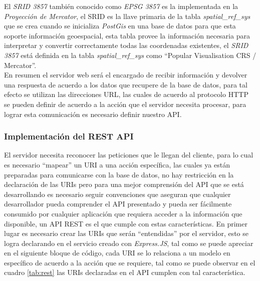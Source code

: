 El \emph{SRID 3857} también conocido como \emph{EPSG 3857} es la implementada en la \emph{Proyección de Mercator}, el SRID  es la llave primaria de la tabla \emph{spatial\_ref\_sys} que se crea cuando se inicializa \emph{PostGis} en una base de datos para que esta soporte información geoespacial, esta tabla provee la información necesaria para interpretar y convertir correctamente todas las coordenadas existentes, el \emph{SRID 3857} está definida en la tabla \emph{spatial\_ref\_sys} como ``Popular Visualisation CRS / Mercator''.\\

En resumen el servidor web será el encargado de recibir información y devolver una respuesta de acuerdo a los datos que recupere de la base de datos, para tal efecto se utilizan las direcciones URL, las cuales de acuerdo al protocolo HTTP se pueden definir de acuerdo a la acción que el servidor necesita procesar, para lograr esta comunicación es necesario definir nuestro API.\\




\subsubsection{Implementación del REST API}
\label{subs:Implementacion del REST API}



El servidor necesita reconocer las peticiones que le llegan del cliente, para lo cual es necesario ``mapear'' un URI a una acción específica, las cuales ya están preparadas para comunicarse con la base de datos, no hay restricción en la declaración de las URIs pero para una mejor comprensión del API que se está desarrollando es necesario seguir convenciones que aseguran que cualquier desarrollador pueda comprender el API presentado y pueda ser fácilmente consumido por cualquier aplicación que requiera acceder a la información que disponible, un API REST es el que cumple con estas características.
En primer lugar es necesario crear las URIs que serán ``entendidas'' por el servidor, esto se logra declarando en el servicio creado con \emph{Express.JS}, tal como se puede apreciar en el siguiente bloque de código, cada URI se lo relaciona a un modelo en específico de acuerdo a la acción que se requiere, tal como se puede observar en el cuadro \ref{tab:rest} las URIs declaradas en el API cumplen con tal característica.\\


